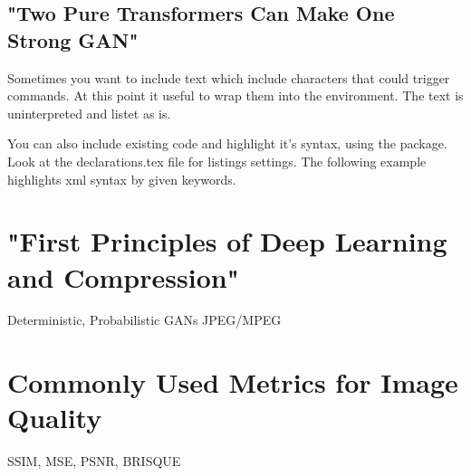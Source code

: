 \subsection{"Two Pure Transformers Can Make One Strong GAN"}

Sometimes you want to include text which include characters that could trigger commands. At this point it useful to wrap them into the  environment. The text is uninterpreted and listet as is.

You can also include existing code and highlight it's syntax, using the  package. Look at the declarations.tex file for listings settings. The following example highlights xml syntax by given keywords.


\section{"First Principles of Deep Learning and Compression"}

Deterministic, Probabilistic
GANs
JPEG/MPEG

\section{Commonly Used Metrics for Image Quality}

SSIM, MSE, PSNR, BRISQUE